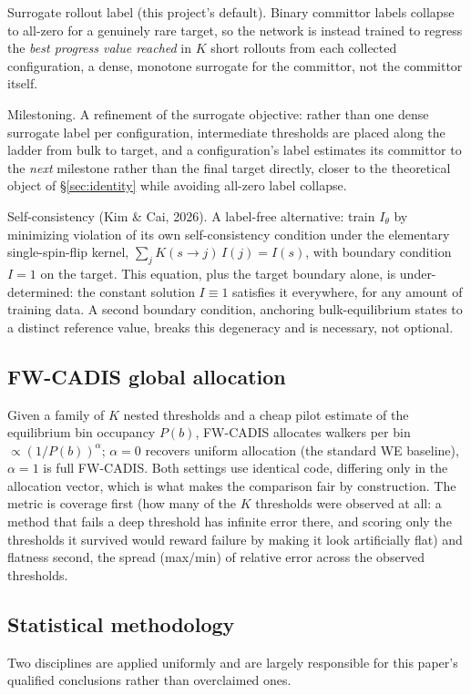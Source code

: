 \documentclass[a4paper,fleqn]{cas-sc}
\begin{document}
Surrogate rollout label (this project's default). Binary committor labels collapse
to all-zero for a genuinely rare target, so the network is instead trained to regress the
\emph{best progress value reached} in $K$ short rollouts from each collected configuration,
a dense, monotone surrogate for the committor, not the committor itself.

Milestoning. A refinement of the surrogate objective: rather than one dense
surrogate label per configuration, intermediate thresholds are placed along the ladder from
bulk to target, and a configuration's label estimates its committor to the \emph{next}
milestone rather than the final target directly, closer to the theoretical object of
\S\ref{sec:identity} while avoiding all-zero label collapse.

Self-consistency (Kim \& Cai, 2026). A label-free alternative: train $I_\theta$ by
minimizing violation of its own self-consistency condition under the elementary
single-spin-flip kernel, $\sum_j K(s\to j)\,I(j)=I(s)$, with boundary condition $I=1$ on the
target. This equation, plus the target boundary alone, is under-determined: the constant
solution $I\equiv1$ satisfies it everywhere, for any amount of training data. A second
boundary condition, anchoring bulk-equilibrium states to a distinct reference value,
breaks this degeneracy and is necessary, not optional.

\subsection{FW-CADIS global allocation}
Given a family of $K$ nested thresholds and a cheap pilot estimate of the equilibrium bin
occupancy $P(b)$, FW-CADIS allocates walkers per bin $\propto (1/P(b))^\alpha$; $\alpha=0$
recovers uniform allocation (the standard WE baseline), $\alpha=1$ is full FW-CADIS. Both
settings use identical code, differing only in the allocation vector, which is what makes
the comparison fair by construction. The metric is coverage first (how many of the
$K$ thresholds were observed at all: a method that fails a deep threshold has infinite
error there, and scoring only the thresholds it survived would reward failure by making it
look artificially flat) and flatness second, the spread (max/min) of relative error
across the observed thresholds.

\subsection{Statistical methodology}
Two disciplines are applied uniformly and are largely responsible for this paper's
qualified conclusions rather than overclaimed ones.
\end{document}

